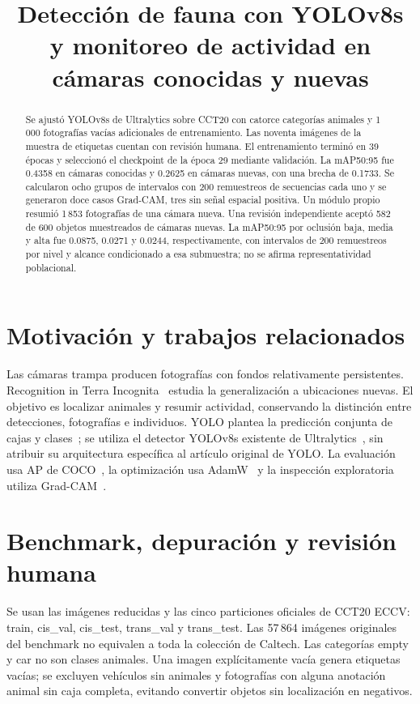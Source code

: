
\usepackage{float}
\title{Detección de fauna con YOLOv8s y monitoreo de actividad en cámaras conocidas y nuevas}

\maketitle
\begin{abstract}
Se ajustó YOLOv8s de Ultralytics sobre CCT20 con catorce categorías animales y
1\,000 fotografías vacías adicionales de entrenamiento. Las noventa imágenes de
la muestra de etiquetas cuentan con revisión humana. El entrenamiento terminó
 en 39 épocas y seleccionó el checkpoint de la época 29 mediante validación.
La mAP50:95 fue 0.4358 en cámaras conocidas y 0.2625 en cámaras nuevas, con una
brecha de 0.1733. Se calcularon ocho grupos de intervalos con 200 remuestreos de
secuencias cada uno y se generaron doce casos Grad-CAM, tres sin señal espacial
positiva. Un módulo propio resumió 1\,853 fotografías de una cámara nueva.
Una revisión independiente aceptó 582 de 600 objetos muestreados de cámaras nuevas.
La mAP50:95 por oclusión baja, media y alta fue 0.0875, 0.0271 y 0.0244,
respectivamente, con intervalos de 200 remuestreos por nivel y alcance condicionado
a esa submuestra; no se afirma representatividad poblacional.
\end{abstract}

\section{Motivación y trabajos relacionados}
Las cámaras trampa producen fotografías con fondos relativamente persistentes.
Recognition in Terra Incognita~\cite{terra} estudia la generalización a ubicaciones nuevas.
El objetivo es localizar animales y resumir actividad, conservando la distinción entre
 detecciones, fotografías e individuos. YOLO plantea la predicción conjunta de cajas y
clases~\cite{yolo}; se utiliza el detector YOLOv8s existente de Ultralytics~\cite{yolov8},
sin atribuir su arquitectura específica al artículo original de YOLO.
La evaluación usa AP de COCO~\cite{coco}, la optimización usa AdamW~\cite{adamw}
y la inspección exploratoria utiliza Grad-CAM~\cite{gradcam}.

\section{Benchmark, depuración y revisión humana}
Se usan las imágenes reducidas y las cinco particiones oficiales de CCT20 ECCV:
train, cis\_val, cis\_test, trans\_val y trans\_test. Las 57\,864 imágenes originales
 del benchmark no equivalen a toda la colección de Caltech. Las categorías empty y car
no son clases animales. Una imagen explícitamente vacía genera etiquetas vacías;
se excluyen vehículos sin animales y fotografías con alguna anotación animal sin caja
completa, evitando convertir objetos sin localización en negativos.

